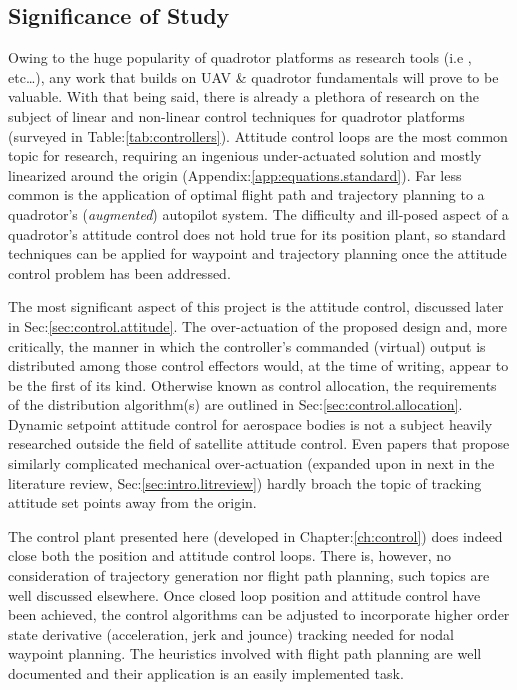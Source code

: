 \subsection{Significance of Study}
\label{subsec:intro.foreword.significance}
Owing to the huge popularity of quadrotor platforms as research tools (i.e \cite{x4flyercontrol,intelligentbackstep,fullquadcoptercontrol}, etc\ldots), any work that builds on UAV \& quadrotor fundamentals will prove to be valuable. With that being said, there is already a plethora of research on the subject of linear and non-linear control techniques for quadrotor platforms (surveyed in Table:\ref{tab:controllers}). Attitude control loops are the most common topic for research, requiring an ingenious under-actuated solution and mostly linearized around the origin (Appendix:\ref{app:equations.standard}). Far less common is the application of optimal flight path and trajectory planning to a quadrotor's (\emph{augmented}) autopilot system. The difficulty and ill-posed aspect of a quadrotor's attitude control does not hold true for its position plant, so standard techniques can be applied for waypoint and trajectory planning once the attitude control problem has been addressed.
\par
The most significant aspect of this project is the attitude control, discussed later in Sec:\ref{sec:control.attitude}. The over-actuation of the proposed design and, more critically, the manner in which the controller's commanded (virtual) output is distributed among those control effectors would, at the time of writing, appear to be the first of its kind. Otherwise known as control allocation, the requirements of the distribution algorithm(s) are outlined in Sec:\ref{sec:control.allocation}. Dynamic setpoint attitude control for aerospace bodies is not a subject heavily researched outside the field of satellite attitude control. Even papers that propose similarly complicated mechanical over-actuation (expanded upon in next in the literature review, Sec:\ref{sec:intro.litreview}) hardly broach the topic of tracking attitude set points away from the origin.
\par
The control plant presented here (developed in Chapter:\ref{ch:control}) does indeed close both the position and attitude control loops. There is, however, no consideration of trajectory generation nor flight path planning, such topics are well discussed elsewhere. Once closed loop position and attitude control have been achieved, the control algorithms can be adjusted to incorporate higher order state derivative (acceleration, jerk and jounce) tracking needed for nodal waypoint planning. The heuristics involved with flight path planning are well documented\cite{trajectorygeneration,modelingquadcopter,trajectorytracking} and their application is an easily implemented task.
